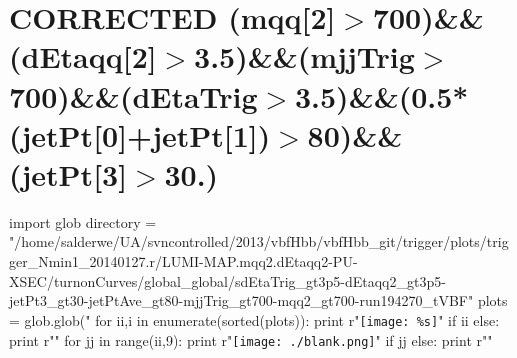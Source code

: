 \documentclass[12pt,english,dvipsnames]{beamer}
\newcommand{\UAoverlay}[0]{%
\begin{tikzpicture}[remember picture,overlay,shift={(current page.north east)}]
\node (zero) at (-1.8cm,-0.93cm) {\texttt{[image: ../logos/CMS.pdf]}\hspace{0.15cm}\texttt{[image: ../logos/CERN.pdf]}\hspace{0.15cm}\texttt{[image: ../logos/UA.pdf]}}; 
\end{tikzpicture}
}
\begin{document}
\section{\tiny CORRECTED (mqq[2]$>$700)\&\&(dEtaqq[2]$>$3.5)\&\&(mjjTrig$>$700)\&\&(dEtaTrig$>$3.5)\&\&(0.5*(jetPt[0]+jetPt[1])$>$80)\&\&(jetPt[3]$>$30.)}
\begin{frame}[t,fragile]%
\begin{python}
import glob
directory = "/home/salderwe/UA/svncontrolled/2013/vbfHbb/vbfHbb_git/trigger/plots/trigger_Nmin1_20140127.r/LUMI-MAP.mqq2.dEtaqq2-PU-XSEC/turnonCurves/global_global/sdEtaTrig_gt3p5-dEtaqq2_gt3p5-jetPt3_gt30-jetPtAve_gt80-mjjTrig_gt700-mqq2_gt700-run194270_tVBF"
plots = glob.glob("%
for ii,i in enumerate(sorted(plots)):
  print r"\texttt{[image: \%s]}"%
  if ii%
  else: print r"\hfill"
for jj in range(ii,9):
  print r"\texttt{[image: ./blank.png]}"
  if jj%
  else: print r"\hfill"
\end{python}

\end{frame}
% 
\end{document}
